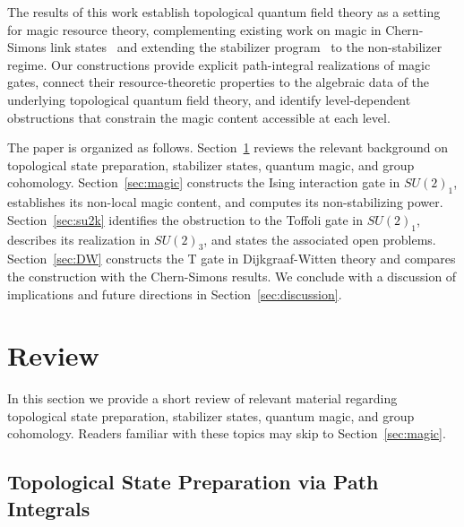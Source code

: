 \documentclass[12pt,a4paper]{article}
\begin{document}
The results of this work establish topological quantum field theory as a setting for magic resource theory, complementing existing work on magic in Chern-Simons link states~\cite{Fliss:2021} and extending the stabilizer program~\cite{Salton:2016qpp,Cummings:2025zfe,Balasubramanian:2025kaf,Munizzi:2025suf} to the non-stabilizer regime. Our constructions provide explicit path-integral realizations of magic gates, connect their resource-theoretic properties to the algebraic data of the underlying topological quantum field theory, and identify level-dependent obstructions that constrain the magic content accessible at each level.

The paper is organized as follows. Section~\ref{Background} reviews the relevant background on topological state preparation, stabilizer states, quantum magic, and group cohomology. Section~\ref{sec:magic} constructs the Ising interaction gate in $SU(2)_1$, establishes its non-local magic content, and computes its non-stabilizing power. Section~\ref{sec:su2k} identifies the obstruction to the Toffoli gate in $SU(2)_1$, describes its realization in $SU(2)_3$, and states the associated open problems. Section~\ref{sec:DW} constructs the T gate in Dijkgraaf-Witten theory and compares the construction with the Chern-Simons results. We conclude with a discussion of implications and future directions in Section~\ref{sec:discussion}.

\section{Review}\label{Background}

In this section we provide a short review of relevant material regarding topological state preparation, stabilizer states, quantum magic, and group cohomology. Readers familiar with these topics may skip to Section~\ref{sec:magic}.

\subsection{Topological State Preparation via Path Integrals}\label{TopologicalStatePrep}
\end{document}
